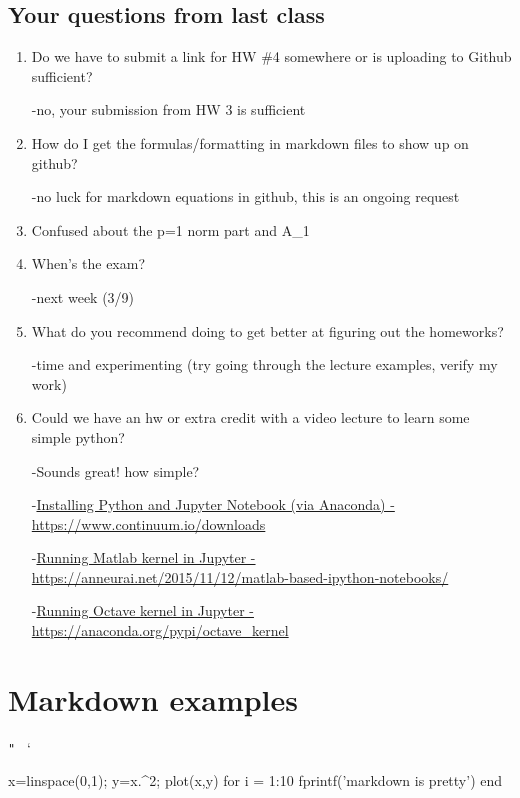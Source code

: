 \documentclass[11pt]{article}
\newenvironment{Shaded}{}{}
\newcommand{\FloatTok}[1]{\textcolor[rgb]{0.25,0.63,0.44}{{#1}}}
\newcommand{\StringTok}[1]{\textcolor[rgb]{0.25,0.44,0.63}{{#1}}}
\newcommand{\NormalTok}[1]{{#1}}
\begin{document}
\subsection{Your questions from last
class}\label{your-questions-from-last-class}

\begin{enumerate}
\def\labelenumi{\arabic{enumi}.}
\item
  Do we have to submit a link for HW \#4 somewhere or is uploading to
  Github sufficient?

  -no, your submission from HW 3 is sufficient
\item
  How do I get the formulas/formatting in markdown files to show up on
  github?

  -no luck for markdown equations in github, this is an ongoing request
\item
  Confused about the p=1 norm part and
  \textbar{}\textbar{}A\textbar{}\textbar{}\_1
\item
  When's the exam?

  -next week (3/9)
\item
  What do you recommend doing to get better at figuring out the
  homeworks?

  -time and experimenting (try going through the lecture examples,
  verify my work)
\item
  Could we have an hw or extra credit with a video lecture to learn some
  simple python?

  -Sounds great! how simple?

  -\href{https://www.continuum.io/downloads}{Installing Python and
  Jupyter Notebook (via Anaconda) - https://www.continuum.io/downloads}

  -\href{https://anneurai.net/2015/11/12/matlab-based-ipython-notebooks/}{Running
  Matlab kernel in Jupyter -
  https://anneurai.net/2015/11/12/matlab-based-ipython-notebooks/}

  -\href{https://anaconda.org/pypi/octave_kernel}{Running Octave kernel
  in Jupyter - https://anaconda.org/pypi/octave\_kernel}
\end{enumerate}

    \section{Markdown examples}\label{markdown-examples}

\texttt{"\ \textquotesingle{}} `

\begin{Shaded}
\begin{Highlighting}[]
\NormalTok{x=linspace(}\FloatTok{0}\NormalTok{,}\FloatTok{1}\NormalTok{);}
\NormalTok{y=x.^}\FloatTok{2}\NormalTok{;}
\NormalTok{plot(x,y)}
\NormalTok{for i = }\FloatTok{1}\NormalTok{:}\FloatTok{10}
    \NormalTok{fprintf(}\StringTok{'markdown is pretty'}\NormalTok{)}
\NormalTok{end}
\end{Highlighting}
\end{Shaded}
\end{document}
